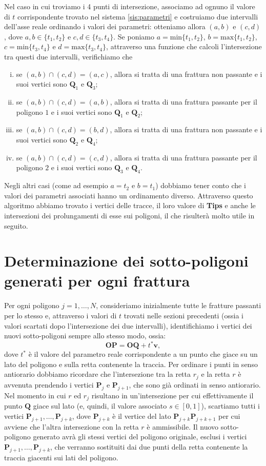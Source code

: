 \documentclass[a4paper]{article}
\newcommand{\B}{\mathbf}
\begin{document}
Nel caso in cui troviamo i 4 punti di intersezione, associamo ad ognuno il valore di $t$ corrispondente trovato nel sistema \eqref{sis:parametri} e costruiamo due intervalli dell'asse reale ordinando i valori dei parametri: otteniamo allora $(a,b)$ e $(c,d)$, dove $a,b\in\{t_1,t_2\}$ e $c,d\in\{t_3,t_4\}$. Se poniamo $a=\text{min}\{t_1,t_2\}$, $b=\text{max}\{t_1,t_2\}$, $c=\text{min}\{t_3,t_4\}$ e $d=\text{max}\{t_3,t_4\}$, attraverso una funzione che calcoli l'intersezione tra questi due intervalli, verifichiamo che
\begin{enumerate} [(i)]
\item se $(a,b)\cap(c,d)=(a,c)$, allora si tratta di una frattura non passante e i suoi vertici sono $\B{Q}_1$ e $\B{Q}_3$;
\item se $(a,b)\cap(c,d)=(a,b)$, allora si tratta di una frattura passante per il poligono $1$ e i suoi vertici sono $\B{Q}_1$ e $\B{Q}_2$;
\item se $(a,b)\cap(c,d)=(b,d)$, allora si tratta di una frattura non passante e i suoi vertici sono $\B{Q}_2$ e $\B{Q}_4$;
\item se $(a,b)\cap(c,d)=(c,d)$, allora si tratta di una frattura passante per il poligono $2$ e i suoi vertici sono $\B{Q}_3$ e $\B{Q}_4$.
\end{enumerate}
Negli altri casi (come ad esempio $a=t_2$ e $b=t_1$) dobbiamo tener conto che i valori dei parametri associati hanno un ordinamento diverso. Attraverso questo algoritmo abbiamo trovato i vertici delle tracce, il loro valore di \textbf{Tips} e anche le intersezioni dei prolungamenti di esse sui poligoni, il che risulterà molto utile in seguito.

\section{Determinazione dei sotto-poligoni generati per ogni frattura}
Per ogni poligono $j=1,\dots,N$, consideriamo inizialmente tutte le fratture passanti per lo stesso e, attraverso i valori di $t$ trovati nelle sezioni precedenti (ossia i valori scartati dopo l'intersezione dei due intervalli), identifichiamo i vertici dei nuovi sotto-poligoni sempre allo stesso modo, ossia:$$\B{OP}=\B{OQ}+t^*\B{v},$$ dove $t^*$ è il valore del parametro reale corrispondente a un punto che giace su un lato del poligono e sulla retta contenente la traccia. Per ordinare i punti in senso antiorario dobbiamo ricordare che l'intersezione tra la retta $r_j$ e la retta $r$ è avvenuta prendendo i vertici $\B{P}_j$ e $\B{P}_{j+1}$, che sono già ordinati in senso antiorario. Nel momento in cui $r$ ed $r_j$ risultano in un'intersezione per cui effettivamente il punto $\B{Q}$ giace sul lato (e, quindi, il valore associato $s\in[0,1]$), scartiamo tutti i vertici $\B{P}_{j+1},\dots,\B{P}_{j+k}$, dove $\B{P}_{j+k}$ è il vertice del lato $\B{P}_{j+k}\B{P}_{j+k+1}$ per cui avviene che l'altra intersezione con la retta $r$ è ammissibile. Il nuovo sotto-poligono generato avrà gli stessi vertici del poligono originale, esclusi i vertici $\B{P}_{j+1},\dots,\B{P}_{j+k}$, che verranno sostituiti dai due punti della retta contenente la traccia giacenti sui lati del poligono. 
\end{document}
